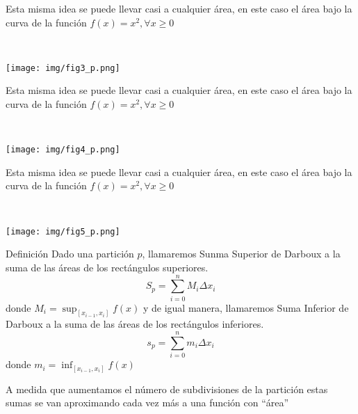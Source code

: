 \documentclass[xcolor=table, t]{beamer}
\begin{document}
	\begin{frame}
		\begin{block}{}
			Esta misma idea se puede llevar casi a cualquier área, en este caso el área bajo la curva de la función $f(x)=x^2, \forall x\geq0$
		\end{block}
		\ \\
		\begin{center}
			\texttt{[image: img/fig3\_p.png]}
		\end{center}
	\end{frame}
	\begin{frame}
		\begin{block}{}
			Esta misma idea se puede llevar casi  a cualquier área, en este caso el área bajo la curva de la función $f(x)=x^2, \forall x\geq0$
		\end{block}
		\ \\
		\begin{center}
			\texttt{[image: img/fig4\_p.png]}
		\end{center}
	\end{frame}
	\begin{frame}
		\begin{block}{}
			Esta misma idea se puede llevar casi a cualquier área, en este caso el área bajo la curva de la función $f(x)=x^2, \forall x\geq0$
		\end{block}
		\ \\
		\begin{center}
			\texttt{[image: img/fig5\_p.png]}
		\end{center}
	\end{frame}
	\begin{frame}
		\begin{block}{Definición}
			Dado una partición $p$, llamaremos Sunma Superior de Darboux a la suma de las áreas de los rectángulos superiores.
			$$S_p=\sum_{i=0}^nM_i\Delta x_i$$
			donde $M_i=\sup_{[x_{i-1},x_i]}f(x)$
			y de igual manera, llamaremos Suma Inferior de Darboux a la suma de las áreas de los rectángulos inferiores.
			$$s_p=\sum_{i=0}^nm_i\Delta x_i$$
			donde $m_i=\inf_{[x_{i-1},x_i]}f(x)$
		\end{block}
		\pause
		A medida que aumentamos el número de subdivisiones de la partición estas sumas se van aproximando cada vez más a una función con ``área''
	\end{frame}
\end{document}
